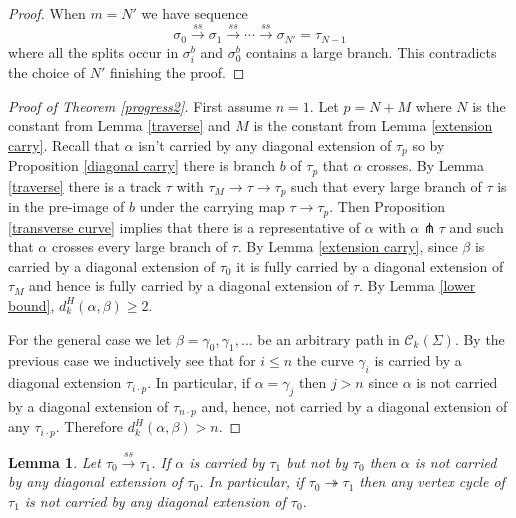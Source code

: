 \documentclass[11pt]{article}
\newtheorem{lemma}[thm]{Lemma}
\theoremstyle{remark}
\def\C{{\mathcal C}}
\def\ss{{\overset{ss}\longrightarrow}}
\begin{document}
\begin{proof}
When $m =N'$ we have sequence  
$$\sigma_0 \ss\sigma_1 \ss\cdots \ss\sigma_{N'} = \tau_{N-1}$$
where all the splits occur in $\sigma^b_i$ and $\sigma_0^b$ contains a large branch. This contradicts the choice of $N'$ finishing the proof.
\end{proof}

\begin{proof}[Proof of Theorem \ref{progress2}]
First assume $n=1$.
Let $p = N+M$ where $N$ is the constant from Lemma \ref{traverse} and $M$ is the constant from Lemma \ref{extension carry}. Recall that $\alpha$ isn't carried by any diagonal extension of $\tau_p$ so by Proposition \ref{diagonal carry} there is branch $b$ of $\tau_p$ that $\alpha$ crosses.
  By Lemma \ref{traverse} there is a track $\tau$ with $\tau_M \to \tau\to \tau_p$ such that every large branch of $\tau$ is in the pre-image of $b$ under the carrying map $\tau\to\tau_p$. Then Proposition \ref{transverse curve} implies that  there is a representative of $\alpha$ with
$\alpha \pitchfork \tau$ and such that $\alpha$ crosses every large branch of $\tau$.
By Lemma \ref{extension carry}, since $\beta$ is carried by a diagonal extension of $\tau_0$ it is fully carried by a diagonal extension of $\tau_M$  and hence is fully carried by a diagonal extension of $\tau$. By Lemma \ref{lower bound}, $d^H_k(\alpha, \beta) \ge 2$.

For the general case we let $\beta=\gamma_0, \gamma_1, \dots$ be an arbitrary path in $\C_k(\Sigma)$. By the previous case we inductively see that for $i\le n$ the curve $\gamma_i$ is carried by a diagonal extension $\tau_{i\cdot p}$. In particular, if $\alpha =\gamma_j$ then $j>n$ since $\alpha$ is not carried by a diagonal extension of $\tau_{n\cdot p}$ and, hence, not carried by a diagonal extension of any $\tau_{i\cdot p}$.  Therefore $d^H_k(\alpha, \beta)>n$.
\end{proof}

\begin{lemma}\label{no extension carry}
Let $\tau_0 \ss \tau_1$. If $\alpha$ is carried by $\tau_1$ but not by $\tau_0$ then $\alpha$ is not carried by any diagonal extension of $\tau_0$. In particular, if $\tau_0 \twoheadrightarrow \tau_1$ then any vertex cycle of $\tau_1$ is not carried by any diagonal extension of $\tau_0$.
\end{lemma}
\end{document}
